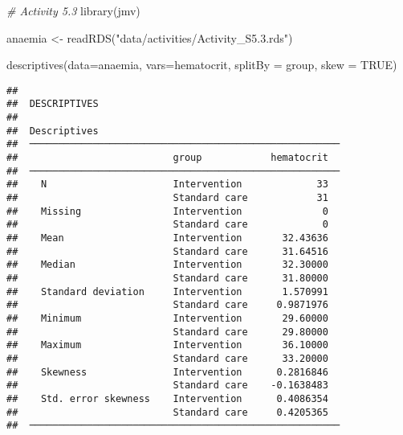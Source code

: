 \documentclass[
]{memoir}
\newenvironment{Shaded}{\begin{snugshade}}{\end{snugshade}}
\newcommand{\AttributeTok}[1]{\textcolor[rgb]{0.77,0.63,0.00}{#1}}
\newcommand{\CommentTok}[1]{\textcolor[rgb]{0.56,0.35,0.01}{\textit{#1}}}
\newcommand{\ConstantTok}[1]{\textcolor[rgb]{0.00,0.00,0.00}{#1}}
\newcommand{\FunctionTok}[1]{\textcolor[rgb]{0.00,0.00,0.00}{#1}}
\newcommand{\NormalTok}[1]{#1}
\newcommand{\OtherTok}[1]{\textcolor[rgb]{0.56,0.35,0.01}{#1}}
\newcommand{\StringTok}[1]{\textcolor[rgb]{0.31,0.60,0.02}{#1}}
\begin{document}
\begin{Shaded}
\begin{Highlighting}[]
\CommentTok{\# Activity 5.3}
\FunctionTok{library}\NormalTok{(jmv)}

\NormalTok{anaemia }\OtherTok{\textless{}{-}} \FunctionTok{readRDS}\NormalTok{(}\StringTok{"data/activities/Activity\_S5.3.rds"}\NormalTok{)}

\FunctionTok{descriptives}\NormalTok{(}\AttributeTok{data=}\NormalTok{anaemia, }\AttributeTok{vars=}\NormalTok{hematocrit,}
             \AttributeTok{splitBy =}\NormalTok{ group,}
             \AttributeTok{skew =} \ConstantTok{TRUE}\NormalTok{)}
\end{Highlighting}
\end{Shaded}

\begin{verbatim}
## 
##  DESCRIPTIVES
## 
##  Descriptives                                           
##  ────────────────────────────────────────────────────── 
##                           group            hematocrit   
##  ────────────────────────────────────────────────────── 
##    N                      Intervention             33   
##                           Standard care            31   
##    Missing                Intervention              0   
##                           Standard care             0   
##    Mean                   Intervention       32.43636   
##                           Standard care      31.64516   
##    Median                 Intervention       32.30000   
##                           Standard care      31.80000   
##    Standard deviation     Intervention       1.570991   
##                           Standard care     0.9871976   
##    Minimum                Intervention       29.60000   
##                           Standard care      29.80000   
##    Maximum                Intervention       36.10000   
##                           Standard care      33.20000   
##    Skewness               Intervention      0.2816846   
##                           Standard care    -0.1638483   
##    Std. error skewness    Intervention      0.4086354   
##                           Standard care     0.4205365   
##  ──────────────────────────────────────────────────────
\end{verbatim}
\end{document}
